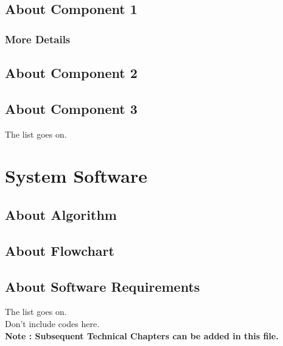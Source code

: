 \section{About Component 1}

\subsection{More Details}

\section{About Component 2}

\section{About Component 3}

The list goes on.



\chapter{System Software}


\section{About Algorithm}

\section{About Flowchart}

\section{About Software Requirements}

The list goes on.\\[2.0cm]
Don't include codes here.\\[2.0cm]


\textbf{{\large Note : Subsequent Technical Chapters can be added in this file.}}